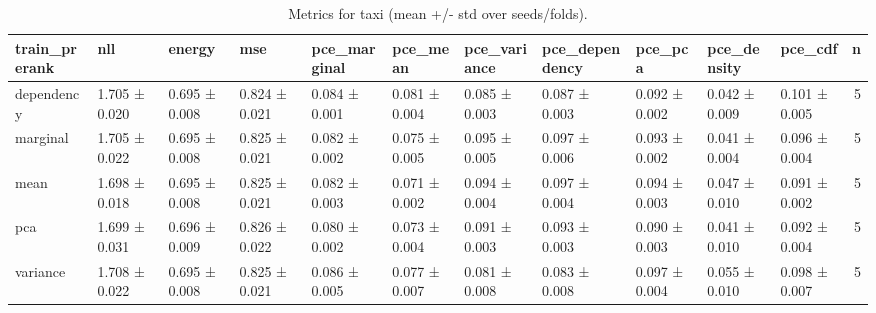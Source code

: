 \begin{table}
\caption{Metrics for taxi (mean +/- std over seeds/folds).}
\label{tab:metrics_summary_taxi}
\begin{tabular}{lllllllllllr}
\toprule
train_prerank & nll & energy & mse & pce_marginal & pce_mean & pce_variance & pce_dependency & pce_pca & pce_density & pce_cdf & n \\
\midrule
dependency & 1.705 ± 0.020 & 0.695 ± 0.008 & 0.824 ± 0.021 & 0.084 ± 0.001 & 0.081 ± 0.004 & 0.085 ± 0.003 & 0.087 ± 0.003 & 0.092 ± 0.002 & 0.042 ± 0.009 & 0.101 ± 0.005 & 5 \\
marginal & 1.705 ± 0.022 & 0.695 ± 0.008 & 0.825 ± 0.021 & 0.082 ± 0.002 & 0.075 ± 0.005 & 0.095 ± 0.005 & 0.097 ± 0.006 & 0.093 ± 0.002 & 0.041 ± 0.004 & 0.096 ± 0.004 & 5 \\
mean & 1.698 ± 0.018 & 0.695 ± 0.008 & 0.825 ± 0.021 & 0.082 ± 0.003 & 0.071 ± 0.002 & 0.094 ± 0.004 & 0.097 ± 0.004 & 0.094 ± 0.003 & 0.047 ± 0.010 & 0.091 ± 0.002 & 5 \\
pca & 1.699 ± 0.031 & 0.696 ± 0.009 & 0.826 ± 0.022 & 0.080 ± 0.002 & 0.073 ± 0.004 & 0.091 ± 0.003 & 0.093 ± 0.003 & 0.090 ± 0.003 & 0.041 ± 0.010 & 0.092 ± 0.004 & 5 \\
variance & 1.708 ± 0.022 & 0.695 ± 0.008 & 0.825 ± 0.021 & 0.086 ± 0.005 & 0.077 ± 0.007 & 0.081 ± 0.008 & 0.083 ± 0.008 & 0.097 ± 0.004 & 0.055 ± 0.010 & 0.098 ± 0.007 & 5 \\
\bottomrule
\end{tabular}
\end{table}
